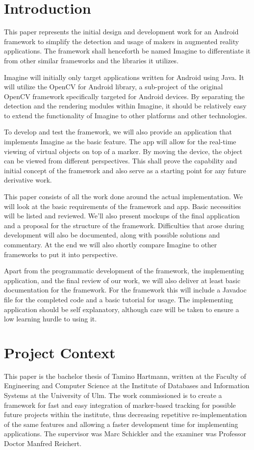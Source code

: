 \section{Introduction}

This paper represents the initial design and development work for an Android framework to simplify the detection and usage of makers in augmented reality applications.
The framework shall henceforth be named Imagine to differentiate it from other similar frameworks and the libraries it utilizes.

Imagine will initially only target applications written for Android\cite{android} using Java.
It will utilize the OpenCV for Android\cite{opencvandroid} library, a sub-project of the original OpenCV framework\cite{opencv} specifically targeted for Android devices.
By separating the detection and the rendering modules within Imagine, it should be relatively easy to extend the functionality of Imagine to other platforms and other technologies.

To develop and test the framework, we will also provide an application that implements Imagine as the basic feature.
The app will allow for the real-time viewing of virtual objects on top of a marker.
By moving the device, the object can be viewed from different perspectives.
This shall prove the capability and initial concept of the framework and also serve as a starting point for any future derivative work.

This paper consists of all the work done around the actual implementation.
We will look at the basic requirements of the framework and app.
Basic necessities will be listed and reviewed.
We'll also present mockups of the final application and a proposal for the structure of the framework.
Difficulties that arose during development will also be documented, along with possible solutions and commentary.
At the end we will also shortly compare Imagine to other frameworks to put it into perspective.

Apart from the programmatic development of the framework, the implementing application, and the final review of our work, we will also deliver at least basic documentation for the framework.
For the framework this will include a Javadoc\cite{docjava} file for the completed code and a basic tutorial for usage.
The implementing application should be self explanatory, although care will be taken to ensure a low learning hurdle to using it.

\section{Project Context}

This paper is the bachelor thesis of Tamino Hartmann, written at the Faculty of Engineering and Computer Science\cite{faculty} at the Institute of Databases and Information Systems at the University of Ulm\cite{ulmuni}.
The work commissioned is to create a framework for fast and easy integration of marker-based tracking for possible future projects within the institute, thus decreasing repetitive re-implementation of the same features and allowing a faster development time for implementing applications.
The supervisor was Marc Schickler and the examiner was Professor Doctor Manfred Reichert.
